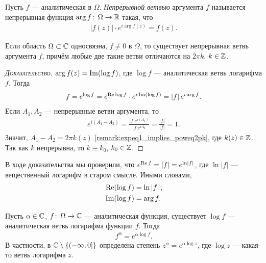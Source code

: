 \documentclass[../../main.tex]{subfiles}
\begin{document}
\begin{df}
 Пусть $ f $ --- аналитическая в $ \Omega $. \textit{Непрерывной ветвью} аргумента $ f $ называется непрерывная функция $ \arg f \colon\, \Omega \to \mathbb{R} $ такая, что
 \begin{align*}
  \left| f(z) \right| \cdot e^{i \arg f(z)} = f(z).
 \end{align*}
\end{df}
\begin{thm}
 Если область $ \Omega \subset \mathbb{C}  $ односвязна, $ f \neq 0 $ в $ \Omega $, то существует непрерывная ветвь аргумента $ f $, причём любые две такие ветви отличаются на $ 2\pi k $, $ k \in \mathbb{Z} $.
\end{thm}
\begin{proof}[\normalfont\textsc{Доказательство}]
 $ \arg f(z) = \operatorname{Im} (\log f) $, где $ \log f $ --- аналитическая ветвь логарифма $ f $. Тогда
 \begin{align*}
 f = e^{\log f} = e^{\operatorname{Re} \log f} \cdot e^{i \operatorname{Im} (\log f)} = \left| f \right| e^{i \arg f}.
 \end{align*} Если $ A_1, A_2 $ --- непрерывные ветви аргумента, то
 \begin{align*}
  e^{i(A_1 - A_2)} = \frac{\left| f \right|e^{i(A_1)}}{\left| f \right|e^{iA_2}} = \frac{\left| f \right|}{\left| f \right|} = 1.
\end{align*} Значит, $ A_1 - A_2 = 2\pi k(z) $ \eqref{remark:expeq1_implies_poweq2pk}, где $ k(z) \in \mathbb{Z} $. Так как $ k $ непрерывна, то $ k \equiv k_0 $, $ k_0 \in \mathbb{Z} $.
\end{proof}
\begin{remrk}
 В ходе доказательства мы проверили, что $ e^{\operatorname{Re} f} = \left| f \right| = e^{\ln \left| f \right|} $, где $ \ln \left| f \right| $ --- вещественный логарифм в старом смысле. Иными словами,
 \begin{align*}
  \operatorname{Re} (\log f) &= \ln \left| f \right|, \\
  \operatorname{Im} (\log f) &= \arg f.
 \end{align*}
\end{remrk}

\begin{df}
 Пусть $ \alpha \in\mathbb{C} $, $ f \colon\, \Omega \to \mathbb{C}   $ --- аналитическая функция, существует $ \log f $  --- аналитическая ветвь логарифма функции $ f $. Тогда
 \begin{align*}
  f^{\alpha} = e^{\alpha \log f}.
 \end{align*} В частности, в $ \mathbb{C} \setminus \left\{ \left(-\infty, 0\right]   \right\} $  определена степень $ z^{\alpha} = e^{\alpha \log z} $, где $ \log z $ --- какая-то ветвь логарифма $ z $.
\end{df}
\end{document}
